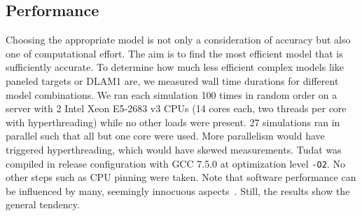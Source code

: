     
%             









\subsection{Performance}
Choosing the appropriate model is not only a consideration of accuracy but also one of computational effort. The aim is to find the most efficient model that is sufficiently accurate. To determine how much less efficient complex models like paneled targets or \gls{DLAM1} are, we measured wall time durations for different model combinations. We ran each simulation 100 times in random order on a server with 2 Intel Xeon E5-2683 v3 CPUs (14 cores each, two threads per core with hyperthreading) while no other loads were present. 27 simulations ran in parallel such that all but one core were used. More parallelism would have triggered hyperthreading, which would have skewed measurements. \gls{Tudat} was compiled in release configuration with GCC 7.5.0 at optimization level \texttt{-O2}. No other steps such as CPU pinning were taken. Note that software performance can be influenced by many, seemingly innocuous aspects~\cite{Mytkowicz2009}. Still, the results show the general tendency.

